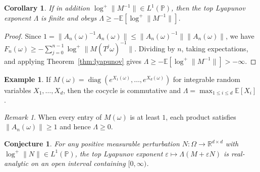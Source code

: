 \documentclass{article}
\newtheorem{corollary}[theorem]{Corollary}
\newtheorem{conjecture}[theorem]{Conjecture}
\theoremstyle{definition}
\newtheorem{example}[theorem]{Example}
\theoremstyle{remark}
\newtheorem{remark}[theorem]{Remark}
\begin{document}
\begin{corollary}
\label{cor:rate}
If in addition $\log^+ \|M^{-1}\| \in L^1(\mathbb{P})$, then the top
Lyapunov exponent $\Lambda$ is finite and obeys
$\Lambda \ge -\mathbb{E}[\log^+ \|M^{-1}\|]$.
\end{corollary}
\begin{proof}
Since $1 = \|A_n(\omega)^{-1} A_n(\omega)\| \le \|A_n(\omega)^{-1}\| \|A_n(\omega)\|$,
we have $F_n(\omega) \ge -\sum_{j=0}^{n-1} \log^+ \|M(T^j \omega)^{-1}\|$.
Dividing by $n$, taking expectations, and applying Theorem~\ref{thm:lyapunov}
gives $\Lambda \ge -\mathbb{E}[\log^+ \|M^{-1}\|] > -\infty$.
\end{proof}

\begin{example}
\label{ex:diagonal}
If $M(\omega) = \operatorname{diag}(e^{X_1(\omega)}, \dots, e^{X_d(\omega)})$
for integrable random variables $X_1, \dots, X_d$, then the cocycle is
commutative and $\Lambda = \max_{1 \le i \le d} \mathbb{E}[X_i]$.
\end{example}

\begin{remark}
\label{rem:nonnegative}
When every entry of $M(\omega)$ is at least $1$, each product satisfies
$\|A_n(\omega)\| \ge 1$ and hence $\Lambda \ge 0$.
\end{remark}

\begin{conjecture}
\label{conj:analyticity}
For any positive measurable perturbation $N : \Omega \to \mathbb{R}^{d \times d}$
with $\log^+ \|N\| \in L^1(\mathbb{P})$, the top Lyapunov exponent
$\varepsilon \mapsto \Lambda(M + \varepsilon N)$ is real-analytic on an open
interval containing $[0, \infty)$.
\end{conjecture}
\end{document}
